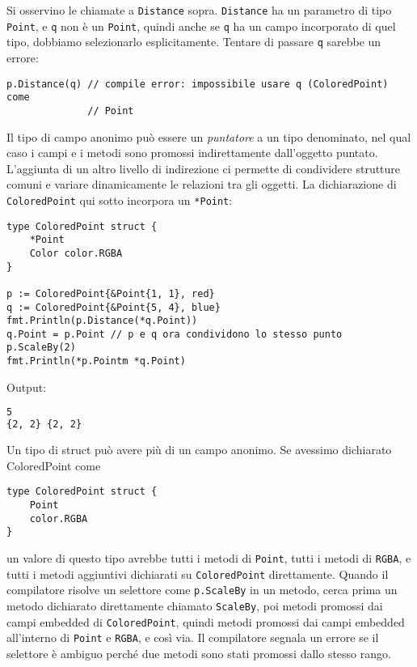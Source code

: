\documentclass[../../thesis.tex]{subfiles}
\begin{document}
    Si osservino le chiamate a \verb"Distance" sopra. \verb"Distance" ha un parametro di tipo \verb"Point", e \verb"q" non è un \verb"Point", quindi anche se \verb"q" ha un campo incorporato di quel tipo, dobbiamo selezionarlo esplicitamente.
    Tentare di passare \verb"q" sarebbe un errore:
    \begin{lstlisting}[frame = single, label = {lst:lstlisting5-3.4}]
p.Distance(q) // compile error: impossibile usare q (ColoredPoint) come
              // Point
    \end{lstlisting}
    Il tipo di campo anonimo può essere un \textit{puntatore} a un tipo denominato, nel qual caso i campi e i metodi sono promossi indirettamente dall'oggetto puntato.
    L'aggiunta di un altro livello di indirezione ci permette di condividere strutture comuni e variare dinamicamente le relazioni tra gli oggetti.
    La dichiarazione di \verb"ColoredPoint" qui sotto incorpora un \verb"*Point":
    \begin{lstlisting}[frame = single, label = {lst:lstlisting5-3.5}]
type ColoredPoint struct {
    *Point
    Color color.RGBA
}

p := ColoredPoint{&Point{1, 1}, red}
q := ColoredPoint{&Point{5, 4}, blue}
fmt.Println(p.Distance(*q.Point))
q.Point = p.Point // p e q ora condividono lo stesso punto
p.ScaleBy(2)
fmt.Println(*p.Pointm *q.Point)
    \end{lstlisting}
    Output:
    \begin{lstlisting}[language = bash, frame = L, label = {lst:lstlisting5-3.6}]
5
{2, 2} {2, 2}
    \end{lstlisting}
    Un tipo di struct può avere più di un campo anonimo.
    Se avessimo dichiarato ColoredPoint come
    \begin{lstlisting}[frame = single, label = {lst:lstlisting5-3.7}]
type ColoredPoint struct {
    Point
    color.RGBA
}
    \end{lstlisting}
    un valore di questo tipo avrebbe tutti i metodi di \verb"Point", tutti i metodi di \verb"RGBA", e tutti i metodi aggiuntivi dichiarati su \verb"ColoredPoint" direttamente.
    Quando il compilatore risolve un selettore come \verb"p.ScaleBy" in un metodo, cerca prima un metodo dichiarato direttamente chiamato \verb"ScaleBy", poi metodi promossi dai campi embedded di \verb"ColoredPoint", quindi metodi promossi dai campi embedded all'interno di \verb"Point" e \verb"RGBA", e così via.
    Il compilatore segnala un errore se il selettore è ambiguo perché due metodi sono stati promossi dallo stesso rango.
    \hfill \vspace{12pt}
\end{document}
